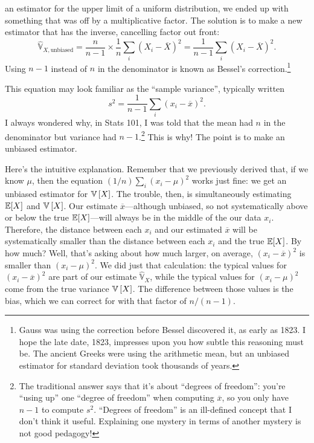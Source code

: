 an estimator for the upper limit of a uniform distribution, we ended up with
something that was off by a multiplicative factor. The solution is to make a new
estimator that has the inverse, cancelling factor out front:
\begin{equation}
\hat{\mathbb{V}}_{X,\mathrm{unbiased}}
  = \frac{n}{n-1} \times \frac{1}{n} \sum_i \left(X_i - \overline{X}\right)^2
  = \frac{1}{n-1} \sum_i \left(X_i - \overline{X}\right)^2.
\end{equation}
Using $n-1$ instead of $n$ in the denominator is known as Bessel's
correction.\footnote{Gauss was using the correction before Bessel discovered
it, as early as 1823. I hope the late date, 1823, impresses upon you how
subtle this reasoning must be. The ancient Greeks were using the arithmetic
mean, but an unbiased estimator for standard deviation took thousands of
years.}

This equation may look familiar as the ``sample variance'', typically written
\begin{equation}
s^2 = \frac{1}{n-1} \sum_i \left(x_i - \overline{x}\right)^2.
\end{equation}
I always wondered why, in Stats 101, I was told that the mean had $n$ in the
denominator but variance had $n-1$.\footnote{The traditional answer says that it's
about ``degrees of freedom'': you're ``using up'' one ``degree of freedom''
when computing $\overline{x}$, so you only have $n-1$ to compute $s^2$.
``Degrees of freedom'' is an ill-defined concept that I don't think it useful.
Explaining one mystery in terms of another mystery is not good pedagogy!}
This is why! The point is to make an unbiased estimator.

Here's the intuitive explanation. Remember that we previously derived that, if
we know $\mu$, then the equation $(1/n) \sum_i (x_i-\mu)^2$ works just fine:
we get an unbiased estimator for $\mathbb{V}\left[{X}\right]$. The trouble, then, is simultaneously
estimating $\mathbb{E}\!\left[{X}\right]$ and $\mathbb{V}\left[{X}\right]$. Our estimate $\overline{x}$---although unbiased,
so not systematically above or below the true $\mathbb{E}\!\left[{X}\right]$---will always be in the
middle of the our data $x_i$. Therefore, the distance between each $x_i$ and our
estimated $\overline{x}$ will be systematically smaller than the distance between
each $x_i$ and the true $\mathbb{E}\!\left[{X}\right]$. By how much? Well, that's asking about how
much larger, on average, $(x_i - \overline{x})^2$ is smaller than $(x_i - \mu)^2$.
We did just that calculation: the typical values for $(x_i - \overline{x})^2$ are
part of our estimate $\hat{\mathbb{V}}_X$, while the typical values for
$(x_i - \mu)^2$ come from the true variance $\mathbb{V}\left[{X}\right]$. The difference between those
values is the bias, which we can correct for with that factor of $n/(n-1)$.

